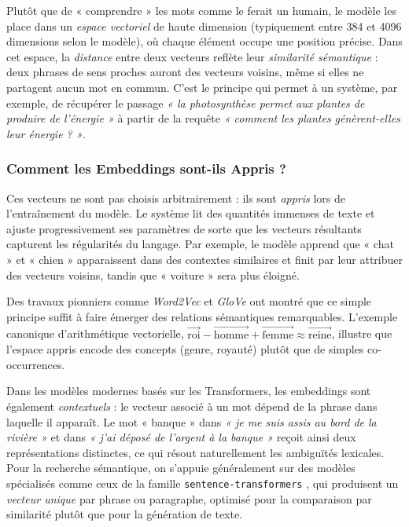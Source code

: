 \documentclass[a4paper,11pt]{article}
\begin{document}
Plutôt que de « comprendre » les mots comme le ferait un humain, le modèle
les place dans un \emph{espace vectoriel} de haute dimension (typiquement
entre 384 et 4096 dimensions selon le modèle), où chaque élément occupe une
position précise. Dans cet espace, la \emph{distance} entre deux vecteurs
reflète leur \emph{similarité sémantique} : deux phrases de sens proches
auront des vecteurs voisins, même si elles ne partagent aucun mot en commun.
C'est le principe qui permet à un système, par exemple, de récupérer le
passage \textit{« la photosynthèse permet aux plantes de produire de
l'énergie »} à partir de la requête \textit{« comment les plantes
génèrent-elles leur énergie ? »}.

\newpage
\subsubsection{Comment les Embeddings sont-ils Appris ?}

Ces vecteurs ne sont pas choisis arbitrairement : ils sont \emph{appris}
lors de l'entraînement du modèle. Le système lit des quantités immenses de
texte et ajuste progressivement ses paramètres de sorte que les vecteurs
résultants capturent les régularités du langage. Par exemple, le modèle
apprend que « chat » et « chien » apparaissent dans des contextes similaires
et finit par leur attribuer des vecteurs voisins, tandis que « voiture »
sera plus éloigné.

Des travaux pionniers comme \emph{Word2Vec} \cite{mikolov2013word2vec} et
\emph{GloVe} \cite{pennington2014glove} ont montré que ce simple principe
suffit à faire émerger des relations sémantiques remarquables. L'exemple
canonique d'arithmétique vectorielle,
$\overrightarrow{\text{roi}} - \overrightarrow{\text{homme}}
+ \overrightarrow{\text{femme}} \approx \overrightarrow{\text{reine}}$,
illustre que l'espace appris encode des concepts (genre, royauté) plutôt que
de simples co-occurrences.

Dans les modèles modernes basés sur les Transformers, les embeddings sont
également \emph{contextuels} : le vecteur associé à un mot dépend de la
phrase dans laquelle il apparaît. Le mot « banque » dans \textit{« je me
suis assis au bord de la rivière »} et dans \textit{« j'ai déposé de
l'argent à la banque »} reçoit ainsi deux représentations distinctes, ce qui
résout naturellement les ambiguïtés lexicales. Pour la recherche sémantique,
on s'appuie généralement sur des modèles spécialisés comme ceux de la
famille \texttt{sentence-transformers} \cite{reimers2019sbert}, qui
produisent un \emph{vecteur unique} par phrase ou paragraphe, optimisé pour
la comparaison par similarité plutôt que pour la génération de texte.
\end{document}
